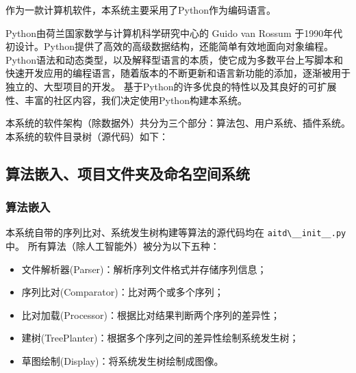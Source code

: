 \documentclass{article}
\begin{document}
\begin{multicols}{2}
\par
作为一款计算机软件，本系统主要采用了Python作为编码语言。
\par
Python由荷兰国家数学与计算机科学研究中心的 Guido van Rossum 于1990年代初设计\cite{ref4}。Python提供了高效的高级数据结构，还能简单有效地面向对象编程。
Python语法和动态类型，以及解释型语言的本质，使它成为多数平台上写脚本和快速开发应用的编程语言，随着版本的不断更新和语言新功能的添加，逐渐被用于独立的、大型项目的开发。
基于Python的许多优良的特性以及其良好的可扩展性、丰富的社区内容，我们决定使用Python构建本系统。
\par
本系统的软件架构（除数据外）共分为三个部分：算法包、用户系统、插件系统。本系统的软件目录树（源代码）如下：
\par
{}

\subsection{算法嵌入、项目文件夹及命名空间系统}

\subsubsection{算法嵌入}
\par
本系统自带的序列比对、系统发生树构建等算法的源代码均在 \verb|aitd\__init__.py| 中。
所有算法（除人工智能外）被分为以下五种：

\begin{itemize}
\item[1)] 文件解析器(Parser)：解析序列文件格式并存储序列信息；
\item[2)] 序列比对(Comparator)：比对两个或多个序列；
\item[3)] 比对加载(Processor)：根据比对结果判断两个序列的差异性；
\item[4)] 建树(TreePlanter)：根据多个序列之间的差异性绘制系统发生树；
\item[5)] 草图绘制(Display)：将系统发生树绘制成图像。
\end{itemize}


\end{multicols}
\end{document}
